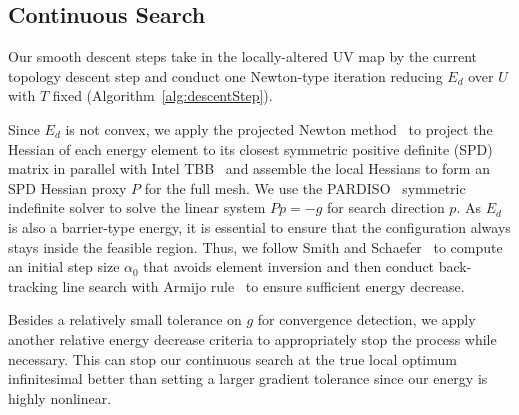 \subsection{Continuous Search}
\label{sec:descentStep}

Our smooth descent steps take in the locally-altered UV map by the current topology descent step and conduct one Newton-type iteration reducing $E_d$ over $U$ with $T$ fixed (Algorithm~\ref{alg:descentStep}).

Since $E_{d}$ is not convex, we apply the projected Newton method\ \cite{Teran2005Robust} to project the Hessian of each energy element to its closest symmetric positive definite (SPD) matrix in parallel with Intel TBB~\cite{Reinders2007Intel} and assemble the local Hessians to form an SPD Hessian proxy $P$ for the full mesh. We use the PARDISO~\cite{pardiso-6.0a, pardiso-6.0b} symmetric indefinite solver to solve the linear system $P p = -g$ for search direction $p$.  As $E_{d}$ is also a barrier-type energy, it is essential to ensure that the configuration always stays inside the feasible region. Thus, we follow Smith and Schaefer~ to compute an initial step size $\alpha_0$ that avoids element inversion and then conduct back-tracking line search with Armijo rule~\cite{Armijo1966Minimization} to ensure sufficient energy decrease.

Besides a relatively small tolerance on $g$ for convergence detection, we apply another relative energy decrease criteria to appropriately stop the process while necessary.
This can stop our continuous search at the true local optimum infinitesimal better than setting a larger gradient tolerance since our energy is highly nonlinear. 

